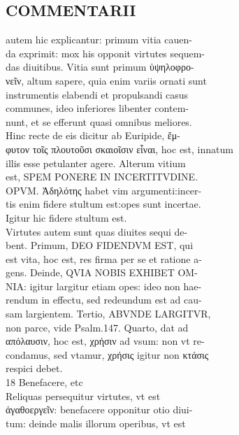 \documentclass{article}
\begin{document}
\begin{pages}
\section*{COMMENTARII \\
                }autem hic explicantur: primum vitia cauen- \\
                da exprimit: mox his opponit virtutes sequem- \\
                das diuitibus. Vitia sunt primum ὑψηλοφρο- \\
                νεῖν, altum sapere, quia enim variis ornati sunt \\
                instrumentis elabendi et propulsandi casus \\
                communes, ideo inferiores libenter contem- \\
                nunt, et se efferunt quasi omnibus meliores. \\
                Hinc recte de eis dicitur ab Euripide, ἔμ- \\
                φυτον τοῖς πλουτοῦσι σκαιοῖσιν εἶναι, hoc est, innatum \\
                illis esse petulanter agere. Alterum vitium \\
                est, SPEM PONERE IN INCERTITVDINE. \\
                OPVM. Ἀδηλότης  habet vim argumenti:incer- \\
                tis enim fidere stultum est:opes sunt incertae. \\
                Igitur hic fidere stultum est. \\
                Virtutes autem sunt quas diuites sequi de- \\
                bent. Primum, DEO FIDENDVM EST, qui \\
                est vita, hoc est, res firma per se et ratione a- \\
                gens. Deinde, QVIA NOBIS EXHIBET OM- \\
                NIA: igitur largitur etiam opes: ideo non hae- \\
                rendum in effectu, sed redeundum est ad cau- \\
                sam largientem. Tertio, ABVNDE LARGITVR, \\
                non parce, vide Psalm.147. Quarto, dat ad \\
                απόλαυσιν, hoc est, χρήσιν ad vsum: non vt re- \\
                condamus, sed vtamur, χρήσις igitur non κτάσις \\
                respici debet. \\
                18 Benefacere, etc \\
                Reliquas persequitur virtutes, vt est \\
                ἀγαθοεργεῖν: benefacere opponitur otio diui- \\
                tum: deinde malis illorum operibus, vt est \\
                

\end{pages}
\end{document}
